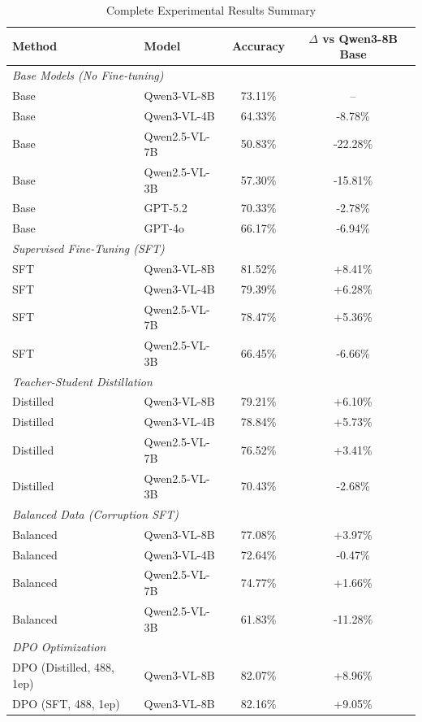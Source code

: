 \documentclass[11pt,a4paper]{article}
\begin{document}
\begin{table}[h]
\centering
\caption{Complete Experimental Results Summary}
\label{tab:complete_results}
\small
\begin{tabular}{llcc}
\toprule
\textbf{Method} & \textbf{Model} & \textbf{Accuracy} & \textbf{$\Delta$ vs Qwen3-8B Base} \\
\midrule
\multicolumn{4}{l}{\textit{Base Models (No Fine-tuning)}} \\
Base & Qwen3-VL-8B & 73.11\% & -- \\
Base & Qwen3-VL-4B & 64.33\% & -8.78\% \\
Base & Qwen2.5-VL-7B & 50.83\% & -22.28\% \\
Base & Qwen2.5-VL-3B & 57.30\% & -15.81\% \\
Base & GPT-5.2 & 70.33\% & -2.78\% \\
Base & GPT-4o & 66.17\% & -6.94\% \\
\midrule
\multicolumn{4}{l}{\textit{Supervised Fine-Tuning (SFT)}} \\
SFT & Qwen3-VL-8B & 81.52\% & +8.41\% \\
SFT & Qwen3-VL-4B & 79.39\% & +6.28\% \\
SFT & Qwen2.5-VL-7B & 78.47\% & +5.36\% \\
SFT & Qwen2.5-VL-3B & 66.45\% & -6.66\% \\
\midrule
\multicolumn{4}{l}{\textit{Teacher-Student Distillation}} \\
Distilled & Qwen3-VL-8B & 79.21\% & +6.10\% \\
Distilled & Qwen3-VL-4B & 78.84\% & +5.73\% \\
Distilled & Qwen2.5-VL-7B & 76.52\% & +3.41\% \\
Distilled & Qwen2.5-VL-3B & 70.43\% & -2.68\% \\
\midrule
\multicolumn{4}{l}{\textit{Balanced Data (Corruption SFT)}} \\
Balanced & Qwen3-VL-8B & 77.08\% & +3.97\% \\
Balanced & Qwen3-VL-4B & 72.64\% & -0.47\% \\
Balanced & Qwen2.5-VL-7B & 74.77\% & +1.66\% \\
Balanced & Qwen2.5-VL-3B & 61.83\% & -11.28\% \\
\midrule
\multicolumn{4}{l}{\textit{DPO Optimization}} \\
DPO (Distilled, 488, 1ep) & Qwen3-VL-8B & 82.07\% & +8.96\% \\
DPO (SFT, 488, 1ep) & Qwen3-VL-8B & 82.16\% & +9.05\% \\

\end{tabular}
\end{table}
\end{document}
